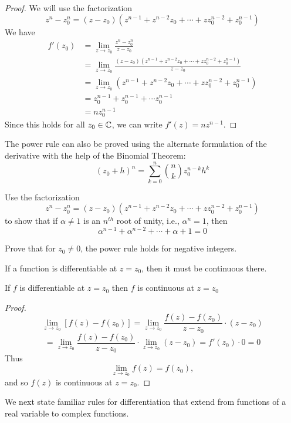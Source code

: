 \documentclass[handout]{ximera}
\begin{document}
\begin{proof}
We will use the factorization
\[
z^n - z_0^n = (z-z_0)\left(z^{n-1} + z^{n-2}z_0 + \cdots + zz_0^{n-2} + z_0^{n-1} \right)
\]
We have
\begin{align*}
f'(z_0) &= \lim_{z \to z_0} \frac{z^n - z_0^n}{z-z_0} \\
        &=\lim_{z \to z_0} \frac{(z-z_0)\left(z^{n-1} + z^{n-2}z_0 + \cdots + zz_0^{n-2} + z_0^{n-1} \right)}{z-z_0} \\
        &= \lim_{z \to z_0} \left(z^{n-1} + z^{n-2}z_0 + \cdots + zz_0^{n-2} + z_0^{n-1} \right)\\
        & = z_0^{n-1} + z_0^{n-1} + \cdots z_0^{n-1}\\
        & = nz_0^{n-1}
\end{align*}
Since this holds for all $z_0 \in \mathbb C$, we can write $f'(z) = nz^{n-1}$.

\end{proof}


\begin{remark}
The power rule can also be proved using the alternate formulation of the derivative with the help of the Binomial Theorem:
\[
(z_0 + h)^n = \sum_{k = 0}^n \binom{n}{k} z_0^{n-k} h^k
\]
\end{remark}


\begin{problem}
Use the factorization 
\[
z^n - z_0^n = (z-z_0)\left(z^{n-1} + z^{n-2}z_0 + \cdots + zz_0^{n-2} + z_0^{n-1} \right)
\]
to show that if $\alpha \neq 1$ is an $n^{th}$ root of unity, i.e., $\alpha^n = 1$, then
\[
\alpha^{n-1} + \alpha^{n-2} + \cdots + \alpha + 1 = 0
\]
\end{problem}

\begin{problem}
Prove that for $z_0 \neq 0$, the power rule holds for negative integers.
\end{problem}

If a function is differentiable at $z= z_0$, then it must be continuous there.
\begin{theorem}
If $f$ is differentiable at $z = z_0$ then $f$ is continuous at $z = z_0$
\end{theorem}
\begin{proof}
\[
\lim_{z\to z_0} \left[f(z) - f(z_0)\right] = \lim_{z\to z_0} \frac{f(z) - f(z_0)}{z-z_0} \cdot (z-z_0)
\]
\[
= \lim_{z\to z_0} \frac{f(z) - f(z_0)}{z-z_0} \cdot \lim_{z\to z_0}(z-z_0) = f'(z_0) \cdot 0 = 0
\]
Thus
\[
 \lim_{z\to z_0} f(z) = f(z_0),
 \]
 and so $f(z)$ is continuous at $z = z_0$.
\end{proof}
We next state familiar rules for differentiation that extend from functions of a real variable to complex functions.
\end{document}
